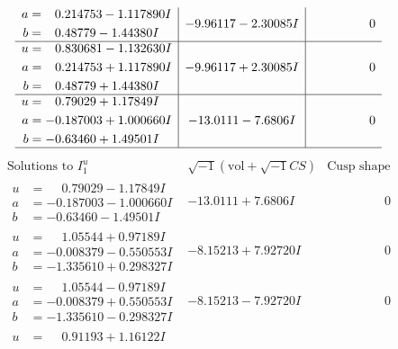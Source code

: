 \documentclass[1p]{elsarticle_modified}
\theoremstyle{definition}
\newcommand{\I}{\sqrt{-1}}
\begin{document}
$$\begin{array}{c|c|c}
\begin{aligned}
a &= \phantom{-}0.214753 - 1.117890 I \\
b &= \phantom{-}0.48779 - 1.44380 I\end{aligned}
 & -9.96117 - 2.30085 I & \phantom{-0.000000 } 0 \\ \hline\begin{aligned}
u &= \phantom{-}0.830681 - 1.132630 I \\
a &= \phantom{-}0.214753 + 1.117890 I \\
b &= \phantom{-}0.48779 + 1.44380 I\end{aligned}
 & -9.96117 + 2.30085 I & \phantom{-0.000000 } 0 \\ \hline\begin{aligned}
u &= \phantom{-}0.79029 + 1.17849 I \\
a &= -0.187003 + 1.000660 I \\
b &= -0.63460 + 1.49501 I\end{aligned}
 & -13.0111 - 7.6806 I & \phantom{-0.000000 } 0\\
 \hline 
 \end{array}$$\newpage$$\begin{array}{c|c|c}  
\text{Solutions to }I^u_{1}& \I (\text{vol} + \sqrt{-1}CS) & \text{Cusp shape}\\
 \hline 
\begin{aligned}
u &= \phantom{-}0.79029 - 1.17849 I \\
a &= -0.187003 - 1.000660 I \\
b &= -0.63460 - 1.49501 I\end{aligned}
 & -13.0111 + 7.6806 I & \phantom{-0.000000 } 0 \\ \hline\begin{aligned}
u &= \phantom{-}1.05544 + 0.97189 I \\
a &= -0.008379 - 0.550553 I \\
b &= -1.335610 + 0.298327 I\end{aligned}
 & -8.15213 + 7.92720 I & \phantom{-0.000000 } 0 \\ \hline\begin{aligned}
u &= \phantom{-}1.05544 - 0.97189 I \\
a &= -0.008379 + 0.550553 I \\
b &= -1.335610 - 0.298327 I\end{aligned}
 & -8.15213 - 7.92720 I & \phantom{-0.000000 } 0 \\ \hline\begin{aligned}
u &= \phantom{-}0.91193 + 1.16122 I \\

\end{aligned}
\end{array}$$
\end{document}
